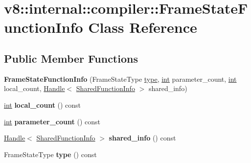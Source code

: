 \hypertarget{classv8_1_1internal_1_1compiler_1_1FrameStateFunctionInfo}{}\section{v8\+:\+:internal\+:\+:compiler\+:\+:Frame\+State\+Function\+Info Class Reference}
\label{classv8_1_1internal_1_1compiler_1_1FrameStateFunctionInfo}
\subsection*{Public Member Functions}
\begin{DoxyCompactItemize}
\item 
\mbox{\label{classv8_1_1internal_1_1compiler_1_1FrameStateFunctionInfo_afb7e7ab73226fd796cf2ba1e5ab5ee3c}} 
{\bfseries Frame\+State\+Function\+Info} (Frame\+State\+Type \mbox{\hyperlink{classstd_1_1conditional_1_1type}{type}}, \mbox{\hyperlink{classint}{int}} parameter\+\_\+count, \mbox{\hyperlink{classint}{int}} local\+\_\+count, \mbox{\hyperlink{classv8_1_1internal_1_1Handle}{Handle}}$<$ \mbox{\hyperlink{classv8_1_1internal_1_1SharedFunctionInfo}{Shared\+Function\+Info}} $>$ shared\+\_\+info)
\item 
\mbox{\label{classv8_1_1internal_1_1compiler_1_1FrameStateFunctionInfo_a7ec13aac377d910be210997d1aa71237}} 
\mbox{\hyperlink{classint}{int}} {\bfseries local\+\_\+count} () const
\item 
\mbox{\label{classv8_1_1internal_1_1compiler_1_1FrameStateFunctionInfo_a01f59fb619f84abc7b5193c4fbca105f}} 
\mbox{\hyperlink{classint}{int}} {\bfseries parameter\+\_\+count} () const
\item 
\mbox{\label{classv8_1_1internal_1_1compiler_1_1FrameStateFunctionInfo_a53b4234b6608ace2ad74d37fbcdaa456}} 
\mbox{\hyperlink{classv8_1_1internal_1_1Handle}{Handle}}$<$ \mbox{\hyperlink{classv8_1_1internal_1_1SharedFunctionInfo}{Shared\+Function\+Info}} $>$ {\bfseries shared\+\_\+info} () const
\item 
\mbox{\label{classv8_1_1internal_1_1compiler_1_1FrameStateFunctionInfo_a68e86fbcc31d17f8d47a34f11d560dfe}} 
Frame\+State\+Type {\bfseries type} () const
\end{DoxyCompactItemize}
